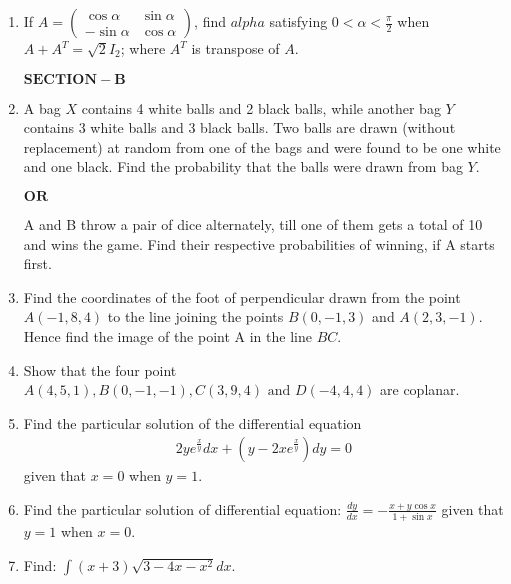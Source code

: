 \documentclass[12pt,-letter paper]{article}
\providecommand{\brak}[1]{\ensuremath{\left(#1\right)}}
\theoremstyle{remark}
\newcommand{\myvec}[1]{\ensuremath{\begin{pmatrix}#1\end{pmatrix}}}
\let\vec\mathbf
\begin{document}
\begin{enumerate}
\item If $A = \myvec{\cos{\alpha} & \sin{\alpha}\\ -\sin{\alpha} & \cos{\alpha}}$, find $alpha$ satisfying $0 < \alpha < \frac{\pi}{2}$ when $A + A^T = \sqrt{2}I_2$; where $A^T$ is transpose of $A$.\\ 

\begin{center} $\vec{SECTION-B}$ \\ \end{center}

\item A bag $X$ contains 4 white balls and 2 black balls, while another bag $Y$ contains 3 white balls and 3 black balls. Two balls are drawn (without replacement) at random from one of the bags and were found to be one white and one black. Find the probability that the balls were drawn from bag $Y$.
\begin{center} $\vec{OR}$ \\ \end{center}
A and B throw a pair of dice alternately, till one of them gets a total of 10 and wins the game. Find their respective probabilities of winning, if A starts first.\\

\item Find the coordinates of the foot of perpendicular drawn from the point $A\brak{-1,8,4}$ to the line joining the points $B\brak{0,-1,3}$ and $A\brak{2,3,-1}$. Hence find the image of the point A in the line $BC$.\\

\item Show that the four point $A\brak{4, 5, 1}, B\brak{0,-1,-1}, C\brak{3,9,4} \text{ and } D\brak{-4,4,4}$ are coplanar.\\

\item Find the particular solution of the differential equation
\begin{align*}
2ye^{\frac{x}{y}}dx + \brak{y - 2xe^{\frac{x}{y}}}dy = 0
\end{align*}
given that $x=0$ when $y=1$.\\
\item Find the particular solution of differential equation: $\frac{dy}{dx} = -\frac{x+y\cos{x}}{1+\sin{x}}$ given that $y = 1$ when $x=0$.\\

\item Find: $\int{\brak{x+3}\sqrt{3 - 4x - x^2}dx}$.\\


\end{enumerate}
\end{document}

